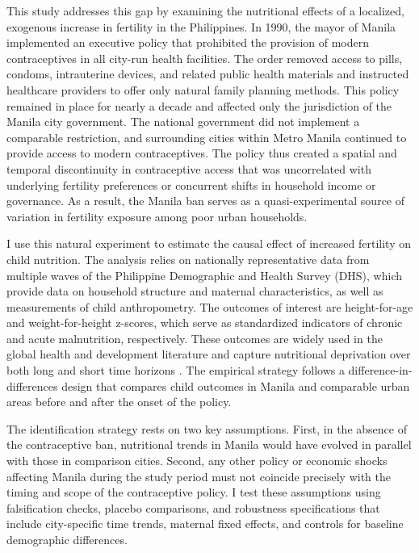 \documentclass[]{AEA}
\begin{document}
This study addresses this gap by examining the nutritional effects of a
localized, exogenous increase in fertility in the Philippines. In 1990,
the mayor of Manila implemented an executive policy that prohibited the
provision of modern contraceptives in all city-run health facilities.
The order removed access to pills, condoms, intrauterine devices, and
related public health materials and instructed healthcare providers to
offer only natural family planning methods. This policy remained in
place for nearly a decade and affected only the jurisdiction of the
Manila city government. The national government did not implement a
comparable restriction, and surrounding cities within Metro Manila
continued to provide access to modern contraceptives. The policy thus
created a spatial and temporal discontinuity in contraceptive access
that was uncorrelated with underlying fertility preferences or
concurrent shifts in household income or governance. As a result, the
Manila ban serves as a quasi-experimental source of variation in
fertility exposure among poor urban households.

I use this natural experiment to estimate the causal effect of increased
fertility on child nutrition. The analysis relies on nationally
representative data from multiple waves of the Philippine Demographic
and Health Survey (DHS), which provide data on household structure and
maternal characteristics, as well as measurements of child
anthropometry. The outcomes of interest are height-for-age and
weight-for-height z-scores, which serve as standardized indicators of
chronic and acute malnutrition, respectively. These outcomes are widely
used in the global health and development literature and capture
nutritional deprivation over both long and short time horizons
\citep{victora2008maternal}. The empirical strategy follows a
difference-in-differences design that compares child outcomes in Manila
and comparable urban areas before and after the onset of the policy.

The identification strategy rests on two key assumptions. First, in the
absence of the contraceptive ban, nutritional trends in Manila would
have evolved in parallel with those in comparison cities. Second, any
other policy or economic shocks affecting Manila during the study period
must not coincide precisely with the timing and scope of the
contraceptive policy. I test these assumptions using falsification
checks, placebo comparisons, and robustness specifications that include
city-specific time trends, maternal fixed effects, and controls for
baseline demographic differences.
\end{document}
